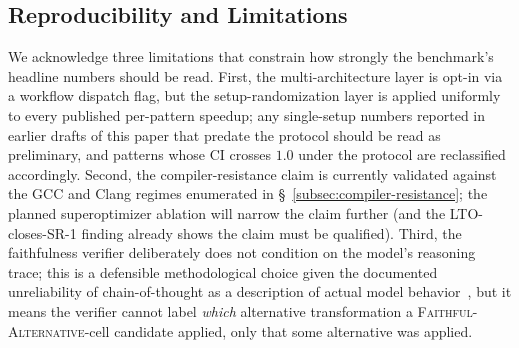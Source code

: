 \subsection{Reproducibility and Limitations}\label{subsec:limits}

We acknowledge three limitations that constrain how strongly the benchmark's headline numbers should be read. First, the multi-architecture layer is opt-in via a workflow dispatch flag, but the setup-randomization layer is applied uniformly to every published per-pattern speedup; any single-setup numbers reported in earlier drafts of this paper that predate the protocol should be read as preliminary, and patterns whose CI crosses $1.0$ under the protocol are reclassified accordingly. Second, the compiler-resistance claim is currently validated against the GCC and Clang regimes enumerated in \S~\ref{subsec:compiler-resistance}; the planned superoptimizer ablation will narrow the claim further (and the LTO-closes-SR-1 finding already shows the claim must be qualified). Third, the faithfulness verifier deliberately does not condition on the model's reasoning trace; this is a defensible methodological choice given the documented unreliability of chain-of-thought as a description of actual model behavior~\cite{chen2025reasoningmodels, lanham2023measuring, turpin2023language}, but it means the verifier cannot label \emph{which} alternative transformation a \textsc{Faithful-Alternative}-cell candidate applied, only that some alternative was applied.

